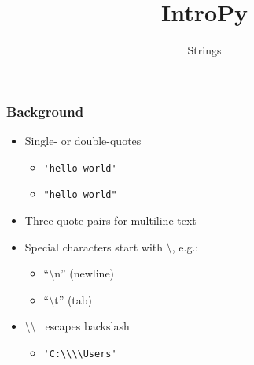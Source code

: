 \documentclass{beamer}
\title{IntroPy}
\subtitle{Strings}
\begin{document}
\frame{\titlepage}



\begin{frame}
  \frametitle{Background}
  \begin{itemize}
    \item Single- or double-quotes
      \begin{itemize}
        \item \lstinline{'hello world'} 
	\item \lstinline{"hello world"}
      \end{itemize}

    \item Three-quote pairs for multiline text

    \item Special characters start with \textbackslash, e.g.: 
      \begin{itemize}
        \item ``\textbackslash n'' (newline)
	\item ``\textbackslash t'' (tab) 
      \end{itemize}

    \item \textbackslash \textbackslash~ escapes backslash 
      \begin{itemize}
        \item \lstinline{'C:\\\\Users'}
      \end{itemize}

 \end{itemize}
\end{frame}
\end{document}
